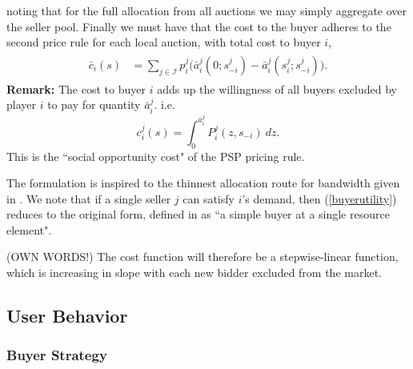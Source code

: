 \documentclass[sigconf, anonymous]{acmart}
\newcommand{\mcI}{\mathcal{I}}
\theoremstyle{definition}
\begin{document}
noting that for the full allocation from all auctions we may simply aggregate
over the seller pool.
Finally we must have that the cost to the buyer adheres to the second price
rule for each local auction, with total cost to buyer $i$,
\begin{align}\label{datacost}
\begin{split}
    \bar{c}_i(s) &= \displaystyle\sum_{j\in\mcI} 
    p_i^j \bigg(\bar{a}_i^j(0; s_{-i}^j)
    -\bar{a}_i^j(s_i^j;s_{-i}^j)\bigg).
\end{split}
\end{align}
\textbf{Remark:} The cost to buyer $i$ adds up the willingness
of all buyers excluded by player $i$ to pay for quantity $\bar{a}_i^j$. i.e.
$$
    c_i^j(s) = \displaystyle\int_0^{\bar{a}_i^j} P_i^j(z, s_{-i}) \ dz.
$$
This is the ``social opportunity cost" of the PSP pricing rule.

The formulation is inspired to the thinnest allocation route for
bandwidth given in \cite{lazar}. We note that if a single seller $j$ can
satisfy $i$'s demand, then
(\ref{buyerutility}) reduces to the original form, defined in
\cite{semret} as ``a simple buyer at a single resource element".

(OWN WORDS!)
The cost function will therefore be a stepwise-linear function, which is
increasing in slope with each new bidder excluded from the market.

\subsection{User Behavior}

\subsubsection{Buyer Strategy}
 
\end{document}
